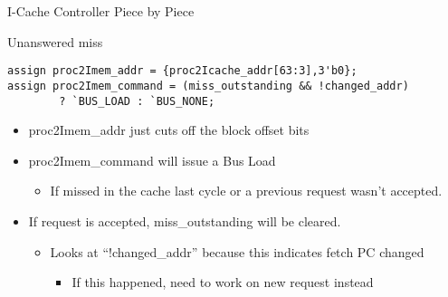 \documentclass[table,dvipsnames]{beamer}
\begin{document}
\begin{frame}[fragile]{I-Cache Controller Piece by Piece}
	\begin{block}{Unanswered miss}
		\begin{verbatim}
assign proc2Imem_addr = {proc2Icache_addr[63:3],3'b0};
assign proc2Imem_command = (miss_outstanding && !changed_addr) 
		? `BUS_LOAD : `BUS_NONE;		\end{verbatim}

	\begin{itemize}
		\item proc2Imem\_addr just cuts off the block offset bits 
		\item proc2Imem\_command will issue a Bus Load 
		\begin{itemize} \item If missed in the cache last cycle or a previous request wasn't accepted. \end{itemize}
		\item If request is accepted, miss\_outstanding will be cleared.
		\begin{itemize}
			\item Looks at ``!changed\_addr'' because this indicates fetch PC changed
			\begin{itemize}
				\item If this happened, need to work on new request instead
			\end{itemize}
		\end{itemize}
	\end{itemize}

	\end{block}	
\end{frame}
\end{document}
